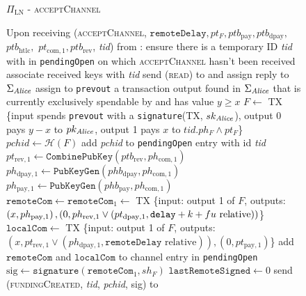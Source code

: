   \begin{figure}[H]
    \begin{protocolbox}{$\Pi_{\mathrm{LN}}$ - \textsc{acceptChannel}}
      \begin{algorithmic}[1]
        \State Upon receiving (\textsc{acceptChannel}, $\mathtt{remoteDelay},
        pt_F, ptb_{\mathrm{pay}}, ptb_{\mathrm{dpay}},$ $ptb_{\mathrm{htlc}},$
        $pt_{\mathrm{com}, 1}, ptb_{\mathrm{rev}}$, \textit{tid}) from \bob:
        \Indent
          \State ensure there is a temporary ID \textit{tid} with \bob{} in
          \texttt{pendingOpen} on which \textsc{acceptChannel} hasn't been
          received
          \State associate received keys with \textit{tid}
          \State send (\textsc{read}) to \ledger{} and assign reply to
          $\Sigma_{\mathit{Alice}}$
          \State assign to \texttt{prevout} a transaction output found in
          $\Sigma_{\mathit{Alice}}$ that is currently exclusively spendable by \alice{}
          and has value $y \geq x$
          \State $F \gets$ TX \{input spends \texttt{prevout} with a
          \texttt{signature}(TX, $sk_{\mathit{Alice}}$), output 0 pays $y - x$ to
          $pk_{\mathit{Alice}}$, output 1 pays $x$ to $\mathit{tid}.ph_F \wedge pt_F$\}
          \State $\mathit{pchid} \gets \mathcal{H}\left(F\right)$
          \State add \textit{pchid} to \texttt{pendingOpen} entry with id
          \textit{tid}
          \State $pt_{\mathrm{rev}, 1} \gets
          \mathtt{CombinePubKey}\left(ptb_{\mathrm{rev}}, ph_{\mathrm{com},
          1}\right)$
          \State $ph_{\mathrm{dpay}, 1} \gets
          \texttt{PubKeyGen}\left(phb_{\mathrm{dpay}}, ph_{\mathrm{com},
          1}\right)$
          \State $ph_{\mathrm{pay}, 1} \gets
          \texttt{PubKeyGen}\left(phb_{\mathrm{pay}}, ph_{\mathrm{com},
          1}\right)$
          \State $\mathtt{remoteCom} \gets \mathtt{remoteCom}_1 \gets$ TX
          \{input: output 1 of $F$, outputs: $\left(x, ph_{\mathrm{pay},
          1}\right), \left(0, ph_{\mathrm{rev}, 1} \vee \left(pt_{\mathrm{dpay},
          1}, \mathtt{delay} + k + fu{} \text{ relative}\right)\right)$\}
          \State $\mathtt{localCom} \gets$ TX \{input: output 1 of $F$, outputs:
          $\left(x, pt_{\mathrm{rev}, 1} \vee \left(ph_{\mathrm{dpay}, 1},
          \mathtt{remoteDelay} \text{ relative}\right)\right), \left(0,
          pt_{\mathrm{pay}, 1}\right)$\}
          \State add $\mathtt{remoteCom}$ and $\mathtt{localCom}$ to channel
          entry in \texttt{pendingOpen}
          \State $\mathrm{sig} \gets
          \mathtt{signature}\left(\mathtt{remoteCom}_1, sh_F\right)$
          \State $\mathtt{lastRemoteSigned} \gets 0$
          \State send (\textsc{fundingCreated}, \textit{tid},
          \textit{pchid}, sig) to \bob{}
        \EndIndent
      \end{algorithmic}
    \end{protocolbox}
    \caption{}
    \label{alg:protocol:open:acceptChannel}
  \end{figure}

